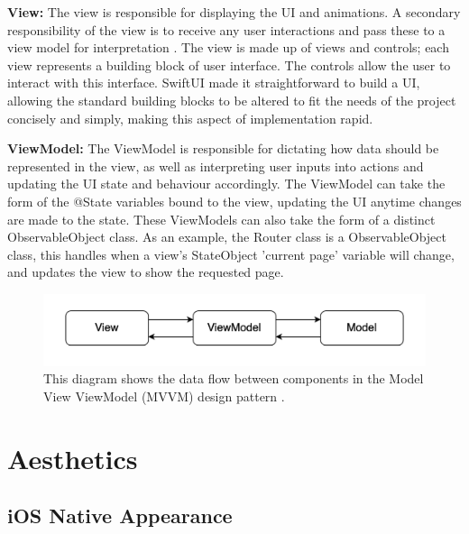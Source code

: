 \documentclass{l4proj}
\begin{document}
\textbf{View:} The view is responsible for displaying the UI and animations. A secondary responsibility of the view is to receive any user interactions and pass these to a view model for interpretation \citep{bulavin_modern_2020}. The view is made up of views and controls; each view represents a building block of user interface. The controls allow the user to interact with this interface. SwiftUI made it straightforward to build a UI, allowing the standard building blocks to be altered to fit the needs of the project concisely and simply, making this aspect of implementation rapid.

\textbf{ViewModel:} The ViewModel is responsible for dictating how data should be represented in the view, as well as interpreting user inputs into actions and updating the UI state and behaviour accordingly. The ViewModel can take the form of the @State variables bound to the view, updating the UI anytime changes are made to the state. These ViewModels can also take the form of a distinct ObservableObject class. As an example, the Router class is a ObservableObject class, this handles when a view's StateObject 'current page' variable will change, and updates the view to show the requested page.


\begin{figure}
    \centering
    \includegraphics[scale=0.5]{images/MVVMDataFlow.png}    
    \caption{This diagram shows the data flow between components in the Model View ViewModel (MVVM) design pattern 
    \citep{bulavin_modern_2020}.}
    \label{fig:MVVMDataFlow} 
\end{figure}


\section{Aesthetics}

\subsection{iOS Native Appearance}
\end{document}
